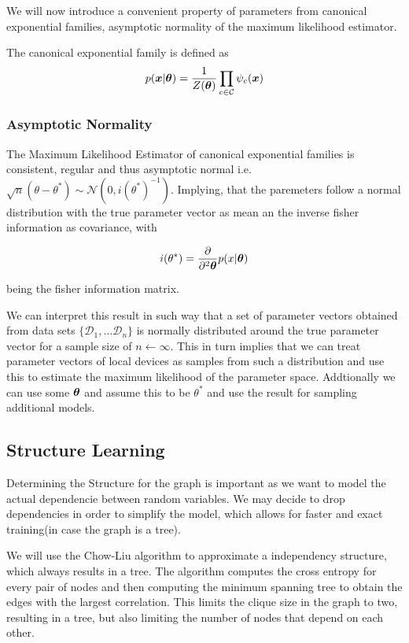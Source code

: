 We will now introduce a convenient property of parameters from canonical exponential families, asymptotic normality of the maximum likelihood estimator. 

The canonical exponential family is defined as 
\begin{equation}
    p(\boldsymbol{x} \lvert \boldsymbol{\theta}) = \frac{1}{Z(\boldsymbol{\theta})} \prod_{c \in \mathcal{C}} \psi_c(\boldsymbol{x})
\end{equation}

\subsubsection{Asymptotic Normality}
\label{ssec:asymp}
The Maximum Likelihood Estimator of canonical exponential families is consistent, regular and thus asymptotic normal i.e. $\sqrt{n}(\theta - \theta^*) \sim \mathcal{N}(0, i(\theta^*)^{-1})$.
Implying, that the paremeters follow a normal distribution with the  true parameter vector as mean an the inverse fisher information as covariance, with 

\begin{equation}
    i(\theta^*) = \frac{\partial}{\partial^2 \boldsymbol{\theta}} p(x \lvert \boldsymbol{\theta})
\end{equation}

being the fisher information matrix.

We can interpret this result in such way that a set of parameter vectors obtained from data sets $\{\mathcal{D}_1, \ldots \mathcal{D}_n\}$ is normally distributed around the true parameter vector for a sample size of $n \leftarrow \infty$. 
This in turn implies that we can treat parameter vectors of local devices as samples from such a distribution and use this to estimate the maximum likelihood of the parameter space.
Addtionally we can use some $\boldsymbol{\theta}$ and assume this to be $\theta^*$ and use the result for sampling additional models.

\subsection{Structure Learning}
    Determining the Structure for the graph is important as we want to model the actual dependencie
    between random variables. 
    We may decide to drop dependencies in order to simplify the model, which allows for faster and exact training(in case the graph is a tree).
    
    We will use the Chow-Liu algorithm to approximate a independency structure, which always results in a tree.
    The algorithm computes the cross entropy for every pair of nodes and then computing the minimum spanning tree to 
    obtain the edges with the largest correlation.
    This limits the clique size in the graph to two, resulting in a tree, but also limiting the number of nodes that depend on each other.

